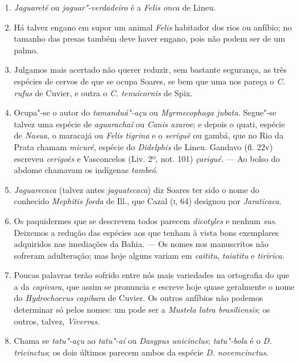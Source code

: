 \begin{enumerate}
\item \textit{Jaguareté} ou \textit{jaguar"-verdadeiro} é a \textit{Felis onca} de Lineu.

\item Há talvez engano em supor um animal \textit{Felis} habitador dos rios ou anfíbio; no 
tamanho das presas também deve haver engano, pois não podem ser de um palmo.

\item Julgamos mais acertado não querer reduzir, sem bastante segurança, as três 
espécies de cervos de que se ocupa Soares, se bem que uma nos pareça o \textit{C. rufus} de 
Cuvier, e outra o \textit{C. tenuicornis} de Spix.

\item Ocupa"-se o autor do \textit{tamanduá"-açu} ou \textit{Myrmecophaga jubata}. Segue"-se talvez 
uma espécie de \textit{aguarachaí} ou \textit{Canis azaroe}; e depois o quati, espécie de \textit{Nasua}, o 
maracajá ou \textit{Felis tigrina} e o \textit{seriguê} ou gambá, que no Rio da Prata chamam \textit{micuré}, 
espécie do \textit{Didelphis} de Lineu. Gandavo (fl. 22v) escreveu \textit{cerigoês} e Vasconcelos (Liv. 
2º, not. 101) \textit{çarigué}. --- Ao bolso do abdome chamavam os indígenas \textit{tambeó}.

\item \textit{Jaguarecaca} (talvez antes \textit{jaguatecaca}) diz Soares ter sido o nome do conhecido  
\textit{Mephitis foeda} de Ill., que Cazal (\textsc{i}, 64) designou por \textit{Jaraticaca}.

\item Os paquidermes que se descrevem todos parecem \textit{dicotyles} e nenhum \textit{sus}. 
Deixemos a redução das espécies aos que tenham à vista bons exemplares adquiridos 
nas imediações da Bahia. --- Os nomes nos manuscritos não sofreram adulteração; mas 
hoje alguns variam em \textit{caititu}, \textit{taiatitu} e \textit{tiririca}.

\item Poucas palavras terão sofrido entre nós mais variedades na ortografia do que a da 
\textit{capivara}, que assim se pronuncia e escreve hoje quase geralmente o nome do  \textit{Hydrochoerus capibara} de Cuvier.
Os outros anfíbios não podemos determinar só pelos nomes: um pode ser a \textit{Mustela lutra brasiliensis}; os outros, 
talvez, \textit{Viverras}.

\item Chama se \textit{tatu"-açu} ao \textit{tatu"-aí} ou \textit{Dasypus unicinclus}; \textit{tatu"-bola} é o \textit{D. tricinctus}; 
os dois últimos parecem ambos da espécie \textit{D. novemcinctus}.


\end{enumerate}
